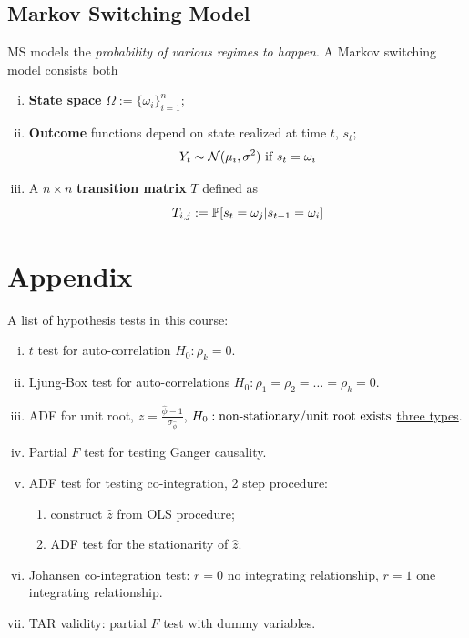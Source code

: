 \documentclass[11pt]{article}
\begin{document}
		\subsection{Markov Switching Model}
			\begin{definition}
				MS models the \emph{probability of various regimes to happen}. A Markov switching model consists both
				\begin{enumerate}[(i)]
					\item \textbf{State space} $\Omega := \{\omega_i\}_{i=1}^n$;
					\item \textbf{Outcome} functions depend on state realized at time $t$, $s_t$;
						\begin{equation}
							Y_t \sim \mathcal{{N}}(\mu_i, \sigma^2) \text{{ if }} s_t = \omega_i
						\end{equation}
					\item A $n \times n$ \textbf{transition matrix} $T$ defined as
					\begin{equation}
						T_{i, j} := \mathbb{P}[{s_t = \omega_j|s_{t-1} = \omega_i}] 
					\end{equation}
				\end{enumerate}
			\end{definition}
			
	\section{Appendix}
		\par A list of hypothesis tests in this course:
		\begin{enumerate}[(i)]
			\item $t$ test for auto-correlation $H_0: \rho_k = 0$.
			\item Ljung-Box test for auto-correlations $H_0: \rho_1 = \rho_2 = \dots = \rho_k = 0$.
			\item ADF for unit root, $z = \frac{\hat{\phi}-1}{\sigma_{\hat{\phi}}}$, $H_0: \text{{non-stationary/unit root exists}}$ \ul{three types}.
			\item Partial $F$ test for testing Ganger causality.
			\item ADF test for testing co-integration, 2 step procedure:
				\begin{enumerate}[(1)]
					\item construct $\hat{z}$ from OLS procedure;
					\item ADF test for the stationarity of $\hat{z}$.
				\end{enumerate}
			\item Johansen co-integration test: $r=0$ no integrating relationship, $r=1$ one integrating relationship.
			\item TAR validity: partial $F$ test with dummy variables.
		\end{enumerate}
\end{document}
